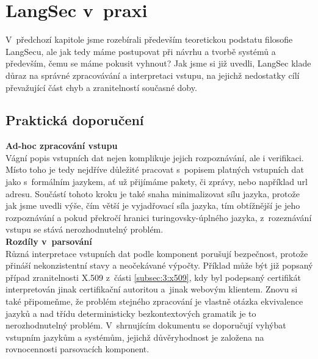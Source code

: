 
\chapter{LangSec v~praxi} \label{ch:langsecapp}
V~předchozí kapitole jsme rozebírali především teoretickou podstatu filosofie LangSecu, ale jak tedy máme postupovat při návrhu a tvorbě systémů
a především, čemu se máme pokusit vyhnout? Jak jsme si již uvedli, LangSec klade důraz na správné zpracovávání a interpretaci vstupu, na jejichž 
nedostatky cílí převažující část chyb a zranitelností současné doby.

\section{Praktická doporučení} \label{sec:5:dosanddonts}

\textbf{Ad-hoc zpracování vstupu} \\
Vágní popis vstupních dat nejen komplikuje jejich rozpoznávání, ale i verifikaci.
Místo toho je tedy nejdříve důležité pracovat s~popisem platných vstupních dat jako s~formálním jazykem, ať už přijímáme pakety, či zprávy, nebo 
například url adresu. Součástí tohoto kroku je také snaha minimalizovat sílu jazyka, protože jak jsme uvedli výše, čím větší je vyjadřovací síla 
jazyka, tím obtížnější je jeho rozpoznávání a pokud překročí hranici turingovsky-úplného jazyka, z~rozeznávání vstupu se stává nerozhodnutelný 
problém. \\

\textbf{Rozdíly v~parsování} \\
Různá interpretace vstupních dat podle komponent porušují bezpečnost, protože přináší nekonzistentní stavy a neočekávané výpočty. Příklad může být 
již popsaný případ zranitelnosti X.509 z~části \ref{subsec:3:x509}, kdy byl podepsaný certifikát interpretován jinak certifikační autoritou a~jinak webovým 
klientem. Znovu si také připomeňme, že problém stejného zpracování je vlastně otázka ekvivalence jazyků a nad třídu deterministicky bezkontextových 
gramatik je to nerozhodnutelný problém. V~shrnujícím dokumentu \cite{LangSecBof} se doporučují vyhýbat vstupním jazykům a systémům, jejichž 
důvěryhodnost je založena na rovnocennosti parsovacích komponent. \\

